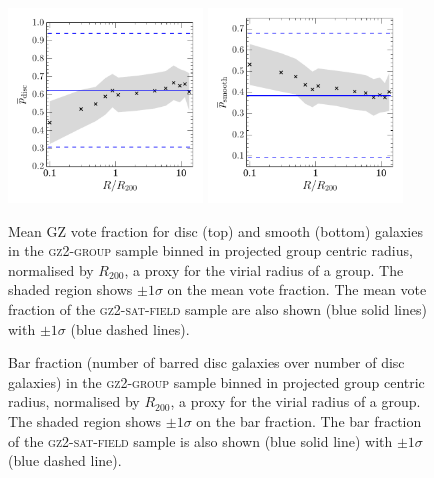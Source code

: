 \begin{figure}
\includegraphics[width=0.46\textwidth]{environment/p_disc_trend_with_log_radius_field_compare.pdf}
\includegraphics[width=0.46\textwidth]{environment/p_smooth_trend_with_log_radius_field_compare.pdf}
\caption{Mean GZ vote fraction for disc (top) and smooth (bottom) galaxies in the \textsc{gz2-group} sample binned in projected group centric radius, normalised by $R_{200}$, a proxy for the virial radius of a group. The shaded region shows $\pm1\sigma$ on the mean vote fraction. The mean vote fraction of the \textsc{gz2-sat-field} sample are also shown (blue solid lines) with $\pm1\sigma$ (blue dashed lines).}
\label{fig:morphradius}
\end{figure}

\begin{figure}
\caption{Bar fraction (number of barred disc galaxies over number of disc galaxies) in the \textsc{gz2-group} sample binned in projected group centric radius, normalised by $R_{200}$, a proxy for the virial radius of a group. The shaded region shows $\pm1\sigma$ on the bar fraction. The bar fraction of the \textsc{gz2-sat-field} sample is also shown (blue solid line) with $\pm1\sigma$ (blue dashed line).}
\label{fig:barradius}
\end{figure}


